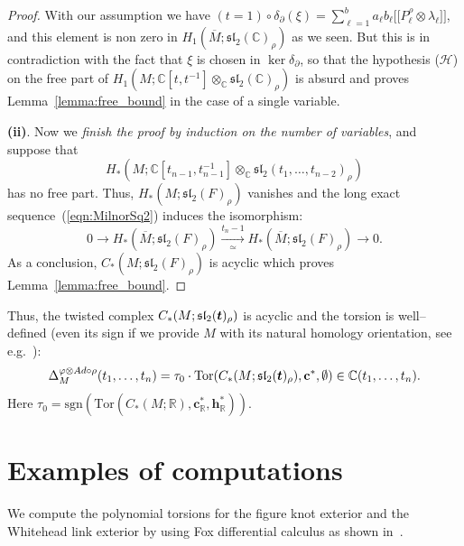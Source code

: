 \documentclass[a4paper]{amsart}
\theoremstyle{plain}
\theoremstyle{definition}
\theoremstyle{remark}
\newcommand{\CC}{{\mathbb C}}
\newcommand{\IR}{{\mathbb R}}
\newcommand{\bm}[1]{\mbox{\boldmath $#1$}}
\newcommand{\sllrho}{\mathfrak{sl}_2(\CC)_\rho}
\newcommand{\sllmt}{\mathfrak{sl}_2(\bm{t})}
\newcommand{\msllrho}[1]{\mathfrak{sl}_2(#1)_\rho}
\newcommand{\PolyTors}[2]{\Delta_{#1}^{#2}}
\newcommand{\Tor}[3]{\mathrm{Tor} ({#1}, {#2}, {#3})}
\newcommand{\otAd}[2]{#1 \otimes Ad \circ #2}
\newcommand{\bbrack}[1]{\lbrack \! \lbrack #1 \rbrack \! \rbrack}
\newcommand{\cbasis}[2][c]{\mathbf{#1}^{#2}}
\newcommand{\hbasis}[2][h]{\mathbf{#1}^{#2}}
\newcommand{\infcover}[1]{\overline{#1}}
\begin{document}
\begin{proof}[Proof]
With our assumption we have 
$(t=1)\circ \delta_\partial(\xi) = 
  \sum_{\ell=1}^{b} a_\ell b_\ell \bbrack{P^\rho_\ell \otimes \lambda_\ell}$, 
and this element is non zero in $H_1(\infcover{M}; \sllrho)$ as we seen. 
But this is in contradiction with the fact that $\xi$ is chosen in $\ker \delta_\partial$, 
so that the
hypothesis ($\mathcal{H}$) on the free part of 
$H_1(M; \CC[t, t^{-1}] \otimes_\CC \sllrho)$ is absurd and 
proves Lemma~\ref{lemma:free_bound} in the case of a single variable.

\medskip 

\noindent \textbf{(ii)}. 
Now we 
\emph{finish the proof by induction on  the number of variables}, 
and suppose that
$$H_*(M; \CC[t_{n-1}, t_{n-1}^{-1}] \otimes_\CC \msllrho{t_1, \ldots, t_{n-2}})$$ 
has no free part. 
Thus, $H_*(M; \msllrho{F})$ vanishes and 
the long exact sequence~(\ref{eqn:MilnorSq2}) induces
the isomorphism:
\[
  0 \to 
  H_*(\infcover{M}; \msllrho{F}) \xrightarrow[\simeq]{t_n - 1}  
  H_*(\infcover{M}; \msllrho{F}) \to
  0.
\]
As a conclusion, $C_*(M; \msllrho{F})$ is acyclic which proves Lemma~\ref{lemma:free_bound}.

\end{proof}

Thus, the twisted complex $C_*(M; \sllmt_\rho)$ is acyclic and the torsion is
well--defined (even its sign if we provide $M$ with its natural
homology orientation, see e.g.~\cite{Turaev:2002}):
\begin{equation}\label{def:polytorsion}
  \PolyTors{M}{\otAd{\varphi}{\rho}}(t_1, \ldots, t_n)
  =
  \tau_0 \cdot 
  \Tor{C_*(M;\sllmt_\rho)}{\cbasis{*}}{\emptyset} 
    \in \CC(t_1, \ldots, t_n).
\end{equation}
Here $ \tau_0 = \mathrm{sgn} (\Tor{C_*(M; \IR)}{\cbasis{*}_\IR}{\hbasis{*}_\IR})$. 

\section{Examples of computations}
\label{section:exemples}

We compute the polynomial torsions for the figure knot exterior and
the Whitehead link exterior by using Fox differential calculus as
shown in~\cite{Milnor:1968,Kitano, KL}.
\end{document}

